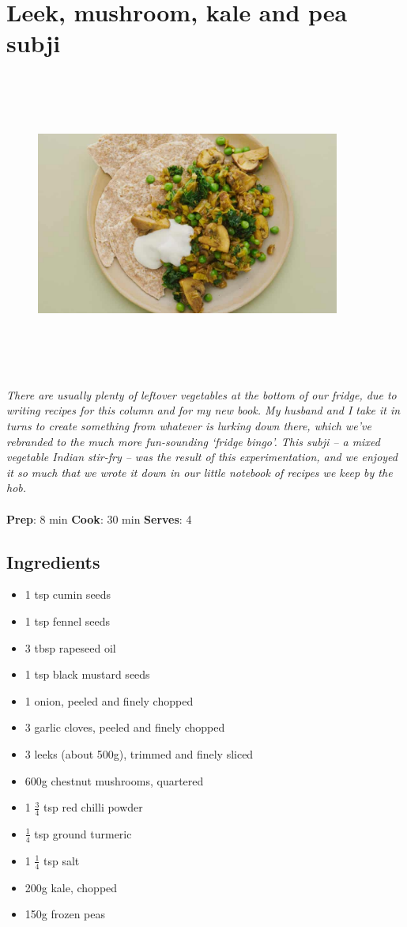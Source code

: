 \documentclass{book}
\begin{document}
\section{Leek, mushroom, kale and pea subji}
\begin{figure}
\centering\includegraphics[width=10cm,height=10cm,keepaspectratio]{Recipe_Pictures/Leek,_mushroom,_kale_and_pea_subji.png}
\end{figure}
\emph{There are usually plenty of leftover vegetables at the bottom of our fridge, due to writing recipes for this column and for my new book. My husband and I take it in turns to create something from whatever is lurking down there, which we’ve rebranded to the much more fun-sounding ‘fridge bingo’. This subji – a mixed vegetable Indian stir-fry – was the result of this experimentation, and we enjoyed it so much that we wrote it down in our little notebook of recipes we keep by the hob.}\\\\ 
\textbf{Prep}: 8 min
\textbf{Cook}: 30 min
\textbf{Serves}: 4
\subsection*{Ingredients}
\begin{itemize}
\item 1 tsp cumin seeds
\item 1 tsp fennel seeds
\item 3 tbsp rapeseed oil
\item 1 tsp black mustard seeds
\item 1 onion, peeled and finely chopped
\item 3 garlic cloves, peeled and finely chopped
\item 3 leeks (about 500g), trimmed and finely sliced
\item 600g chestnut mushrooms, quartered
\item 1 $\frac{3}{4}$ tsp red chilli powder
\item $\frac{1}{4}$ tsp ground turmeric
\item 1 $\frac{1}{4}$ tsp salt
\item 200g kale, chopped
\item 150g frozen peas
\end{itemize}
\end{document}
